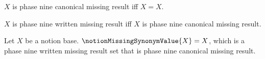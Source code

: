 

\begin{definition}\label{notion_missing_canonical_result}
    $X$ is phase nine canonical missing result iff $X=X$.
\end{definition}

\begin{abbreviation}\label{notion_missing_written_result}
    $X$ is phase nine written missing result iff
    $X$ is phase nine canonical missing result.
\end{abbreviation}

\begin{definition}\label{notion_missing_synonym_value}
    Let $X$ be a notion base.
    $\notionMissingSynonymValue{X}=X$, which is a
        phase nine written missing result set
        that is phase nine canonical missing result.
\end{definition}
